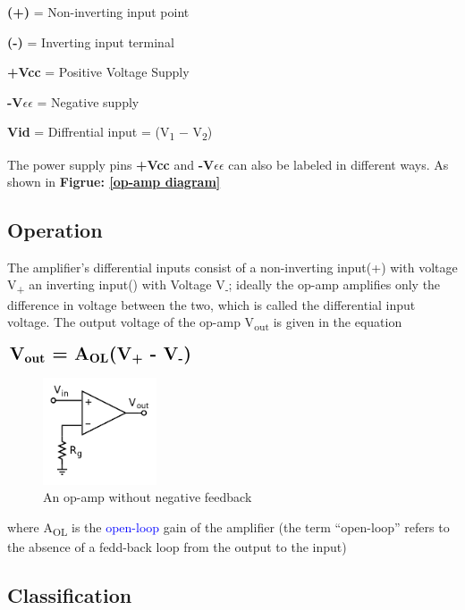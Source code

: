 \documentclass[11pt,a4paper,oneside]{article}
\begin{document}
	\textbf{(+)} = Non-inverting input point

	\textbf{(-)} = Inverting input terminal

	\textbf{+Vcc} = Positive Voltage Supply

	\textbf{-V$\epsilon\epsilon$} = Negative supply

	\textbf{Vid} = Diffrential input = (V\textsubscript{1} $-$ V\textsubscript{2})
	\vskip 0.7cm

	The power supply pins \textbf{+Vcc} and \textbf{-V$\epsilon\epsilon$} can also be labeled in different ways. As shown in \textbf{Figrue: \ref{op-amp diagram}}

	\subsection{Operation}

	The amplifier's differential inputs consist of a non-inverting input(+) with voltage V\textsubscript{+} an inverting input(\-) with Voltage V\textsubscript{-}; ideally the op-amp amplifies only the difference in voltage between the two, which is called the \textsf{differential input voltage}. The output voltage of the op-amp V\textsubscript{out} is given in the equation

	$\bgroup\Large{\textbf{V\textsubscript{out} = A\textsubscript{OL}(V\textsubscript{+} - V\textsubscript{-})}}\egroup{}$

	\begin{figure}[hbt!]
		\centering
		\includegraphics[width=0.3\textwidth]{images/op-amp without negative feedback.png}
		\caption{An op-amp without negative feedback}
	\end{figure}

	where A\textsubscript{OL} is the \textcolor{blue}{open-loop} gain of the amplifier (the term ``open-loop'' refers to the absence of a fedd-back loop from the output to the input)

	\subsection{Classification}
\end{document}
